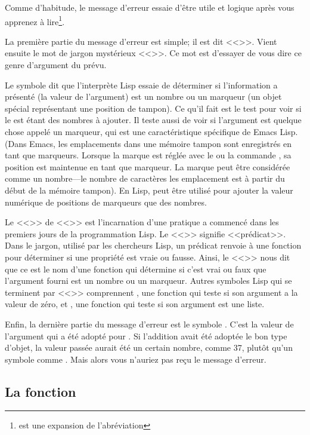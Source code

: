 Comme d'habitude, le message d'erreur essaie d'être utile et logique
après vous apprenez à lire\footnote{ est une
  expansion de l'abréviation }. 

La première partie du message d'erreur est simple; il est dit
<<>>. Vient ensuite le mot de jargon
mystérieux <<>>. Ce mot est d'essayer de vous
dire ce genre d'argument du \tm{+} prévu. 

Le symbole  dit que l'interprète Lisp essaie de
déterminer si l'information a présenté (la valeur de l'argument) est
un nombre ou un marqueur (un objet spécial représentant une position
de tampon). Ce qu'il fait est le test pour voir si le \tm{+} est étant
des nombres à ajouter. Il teste aussi de voir si l'argument est
quelque chose appelé un marqueur, qui est une caractéristique
spécifique de Emacs Lisp. (Dans Emacs, les emplacements dans une
mémoire tampon sont enregistrés en tant que marqueurs. Lorsque la
marque est réglée avec le  ou la commande , sa
position est maintenue en tant que marqueur. La marque peut être
considérée comme un nombre---le nombre de caractères les emplacement
est à partir du début de la mémoire tampon). En Lisp, \tm{+} peut être
utilisé pour ajouter la valeur numérique de positions de marqueurs que
des nombres.

Le <<>> de <<>> est l'incarnation d'une
pratique a commencé dans les premiers jours de la programmation
Lisp. Le <<>> signifie <<prédicat>>. Dans le jargon, utilisé par
les chercheurs Lisp, un prédicat renvoie à une fonction pour
déterminer si une propriété est vraie ou fausse. Ainsi, le <<>>
nous dit que ce  est le nom d'une fonction qui
détermine si c'est vrai ou faux que l'argument fourni est un nombre ou
un marqueur. Autres symboles Lisp qui se terminent par <<>>
comprennent , une fonction qui teste si son argument a la
valeur de zéro, et , une fonction qui teste si son argument
est une liste. 

Enfin, la dernière partie du message d'erreur est le symbole
. C'est la valeur de l'argument qui a été adopté pour
\tm{+}. Si l'addition avait été adoptée le bon type d'objet, la valeur
passée aurait été un certain nombre, comme 37, plutôt qu'un symbole
comme . Mais alors vous n'auriez pas reçu le message d'erreur.

\subsection{La fonction }


